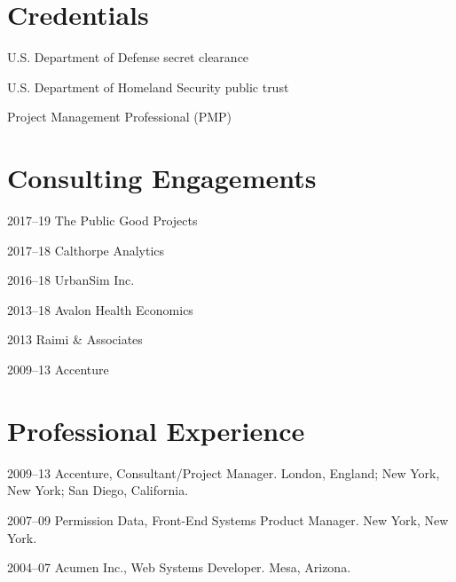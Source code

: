 \documentclass[12pt,letterpaper]{report}
\newcommand{\listitemspace}{0.15em}
\renewenvironment{itemize}
{\begin{list}{}{\setlength{\leftmargin}{0em}
			\setlength{\parskip}{0em}
			\setlength{\itemsep}{\listitemspace}
			\setlength{\parsep}{\listitemspace}}}
	{\end{list}}
\begin{document}
	
	
	\section*{Credentials}
	
	\begin{itemize}
		
		\item U.S. Department of Defense secret clearance
		
		\item U.S. Department of Homeland Security public trust
		
		\item Project Management Professional (PMP)
		
	\end{itemize}
	
	
	
	\section*{Consulting Engagements}
	
	\begin{tablist}
		
		\item[2017--19] \tab The Public Good Projects	
		
		\item[2017--18] \tab Calthorpe Analytics
		
		\item[2016--18] \tab UrbanSim Inc.
		
		\item[2013--18] \tab Avalon Health Economics
		
		\item[2013]     \tab Raimi \& Associates
		
		\item[2009--13] \tab Accenture
		
	\end{tablist}
	
	
	
	\section*{Professional Experience}
	
	\begin{tablist}
		
		\item[2009--13] \tab Accenture, Consultant/Project Manager. London, England; New York, New York; San Diego, California.
		
		\item[2007--09] \tab Permission Data, Front-End Systems Product Manager. New York, New York.
		
		\item[2004--07] \tab Acumen Inc., Web Systems Developer. Mesa, Arizona.
		
	\end{tablist}
	
\end{document}
